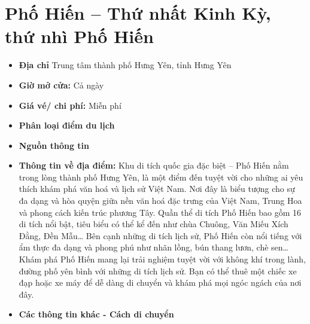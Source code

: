 \documentclass{article}
\begin{document}
\section{Phố Hiến – Thứ nhất Kinh Kỳ, thứ nhì Phố Hiến}
\begin{itemize}
    \item{\textbf{Địa chỉ}} Trung tâm thành phố Hưng Yên, tỉnh Hưng Yên

    \item{\textbf{Giờ mở cửa:}} Cả ngày

    \item{\textbf{Giá vé/ chi phí:}} Miễn phí

    \item{\textbf{Phân loại điểm du lịch}}

    \item{\textbf{Nguồn thông tin}}

    \item{\textbf{Thông tin về địa điểm:}} Khu di tích quốc gia đặc biệt – Phố Hiến nằm trong lòng thành phố Hưng Yên, là một điểm đến tuyệt vời cho những ai yêu thích khám phá văn hoá và lịch sử Việt Nam. Nơi đây là biểu tượng cho sự đa dạng và hòa quyện giữa nền văn hoá đặc trưng của Việt Nam, Trung Hoa và phong cách kiến trúc phương Tây. Quần thể di tích Phố Hiến bao gồm 16 di tích nổi bật, tiêu biểu có thể kể đến như chùa Chuông, Văn Miếu Xích Đằng, Đền Mẫu… Bên cạnh những di tích lịch sử, Phố Hiến còn nổi tiếng với ẩm thực đa dạng và phong phú như nhãn lồng, bún thang lươn, chè sen… Khám phá Phố Hiến mang lại trải nghiệm tuyệt vời với không khí trong lành, đường phố yên bình với những di tích lịch sử. Bạn có thể thuê một chiếc xe đạp hoặc xe máy để dễ dàng di chuyển và khám phá mọi ngóc ngách của nơi đây.
\end{itemize}

\begin{itemize}
    \item{\textbf{Các thông tin khác - Cách di chuyển}}
\end{itemize}
\end{document}

